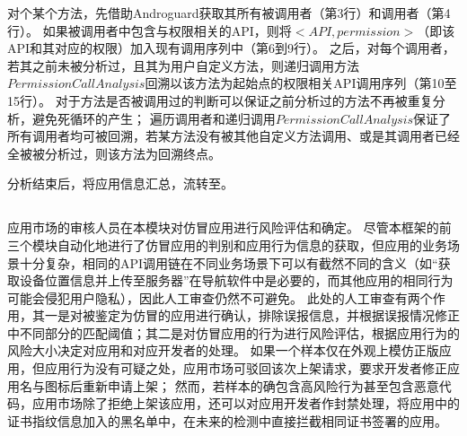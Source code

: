 对个某个方法，\componentC 先借助Androguard获取其所有被调用者（第3行）和调用者（第4行）。
如果被调用者中包含与权限相关的API，则将$<API, permission>$（即该API和其对应的权限）加入现有调用序列中（第6到9行）。
之后，对每个调用者，若其之前未被分析过，且其为用户自定义方法，则递归调用方法$PermissionCallAnalysis$回溯以该方法为起始点的权限相关API调用序列（第10至15行）。
对于方法是否被调用过的判断可以保证之前分析过的方法不再被重复分析，避免死循环的产生；
遍历调用者和递归调用$PermissionCallAnalysis$保证了所有调用者均可被回溯，若某方法没有被其他自定义方法调用、或是其调用者已经全被被分析过，则该方法为回溯终点。

分析结束后，\componentC 将应用信息汇总，流转至\componentD 。

\subsection{\componentD }

应用市场的审核人员在本模块对仿冒应用进行风险评估和确定。
尽管本框架的前三个模块自动化地进行了仿冒应用的判别和应用行为信息的获取，但应用的业务场景十分复杂，相同的API调用链在不同业务场景下可以有截然不同的含义（如``获取设备位置信息并上传至服务器''在导航软件中是必要的，而其他应用的相同行为可能会侵犯用户隐私），因此人工审查仍然不可避免。
此处的人工审查有两个作用，其一是对被鉴定为仿冒的应用进行确认，排除误报信息，并根据误报情况修正\componentA 中不同部分的匹配阈值；其二是对仿冒应用的行为进行风险评估，根据应用行为的风险大小决定对应用和对应开发者的处理。
如果一个样本仅在外观上模仿正版应用，但应用行为没有可疑之处，应用市场可驳回该次上架请求，要求开发者修正应用名与图标后重新申请上架；
然而，若样本的确包含高风险行为甚至包含恶意代码，应用市场除了拒绝上架该应用，还可以对应用开发者作封禁处理，将应用中的证书指纹信息加入\componentE 的黑名单中，在未来的检测中直接拦截相同证书签署的应用。



